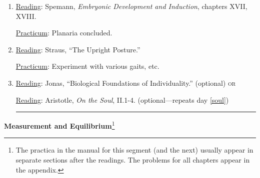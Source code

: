 \documentclass{article}
\newcommand{\rd}{\uline{Reading}}
\newcommand{\pc}{\uline{Practicum}}
\begin{document}
\begin{enumerate}
	\pc: Continued observation and experimentation with planaria.
\item \rd: Spemann, \emph{Embryonic Development and Induction}, chapters XVII, XVIII.

\pc: Planaria concluded.

\item \rd: Straus, ``The Upright Posture.''

\pc: Experiment with various gaits, etc.

\item \rd: Jonas, ``Biological Foundations of Individuality.'' (optional) \textsc{or} 
	 	
\rd: Aristotle, \emph{On the Soul}, II.1-4. (optional---repeats day \ref{soul}) \rule{1.2ex}{1.2ex} 
\end{enumerate}



\newpage

\thispagestyle{plain}
\pagestyle{fancy}
\fancyhead{}



\begin{center}
\textbf{Measurement and Equilibrium}\footnote{The practica in the manual for this segment (and the next) usually appear in separate sections after the readings. The problems for all chapters appear in the appendix.}
\end{center}
\end{document}
